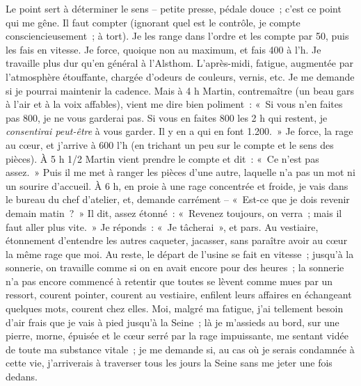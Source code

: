 \documentclass[french,twoside]{book} %
\begin{document}
Le point sert à déterminer le sens – petite presse, pédale douce ; c'est ce point qui me gêne. Il faut compter (ignorant quel est le contrôle, je compte consciencieusement ; à tort). Je les range dans l'ordre et les compte par 50, puis les fais en vitesse. Je force, quoique non au maximum, et fais 400 à l'h. Je travaille plus dur qu'en général à l'Alsthom. L'après-midi, fatigue, augmentée par l'atmosphère étouffante, chargée d'odeurs de couleurs, vernis, etc. Je me demande si je pourrai maintenir la cadence. Mais à 4 h Martin, contremaître (un beau gars à l'air et à la voix affables), vient me dire bien poliment : « Si vous n'en faites pas 800, je ne vous garderai pas. Si vous en faites 800 les 2 h qui restent, je {\itshape consentirai peut-être} à vous garder. Il y en a qui en font 1.200. » Je force, la rage au cœur, et j'arrive à 600 l'h (en trichant un peu sur le compte et le sens des pièces). À 5 h 1/2 Martin vient prendre le compte et dit : « Ce n'est pas assez. » Puis il me met à ranger les pièces d'une autre, laquelle n'a pas un mot ni un sourire d'accueil. À 6 h, en proie à une rage concentrée et froide, je vais dans le bureau du chef d'atelier, et, demande carrément – « Est-ce que je dois revenir demain matin ? » Il dit, assez étonné : « Revenez toujours, on verra ; mais il faut aller plus vite. » Je réponds : « Je tâcherai », et pars. Au vestiaire, étonnement d'entendre les autres caqueter, jacasser, sans paraître avoir au cœur la même rage que moi. Au reste, le départ de l'usine se fait en vitesse ; jusqu'à la sonnerie, on travaille comme si on en avait encore pour des heures ; la sonnerie n’a pas encore commencé à retentir que toutes se lèvent comme mues par un ressort, courent pointer, courent au vestiaire, enfilent leurs affaires en échangeant quelques mots, courent chez elles. Moi, malgré ma fatigue, j'ai tellement besoin d'air frais que je vais à pied jusqu'à la Seine ; là je m'assieds au bord, sur une pierre, morne, épuisée et le cœur serré par la rage impuissante, me sentant vidée de toute ma substance vitale ; je me demande si, au cas où je serais condamnée à cette vie, j'arriverais à traverser tous les jours la Seine sans me jeter une fois dedans.\par
\end{document}
